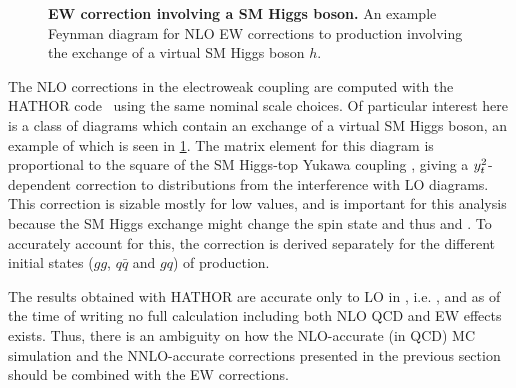 \begin{figure}[t]
    \centering
    \caption{\textbf{EW correction involving a SM Higgs boson.} An example Feynman diagram for NLO EW corrections to \ttbar production involving the exchange of a virtual SM Higgs boson $h$.}
    \label{fig:ah:ewcorr_feynman}
\end{figure}

The NLO corrections in the electroweak coupling \alphaew are computed with the HATHOR code~\cite{Aliev:2010zk, Kuhn:2005it, Kuhn:2006vh, Kuhn:2013zoa} using the same nominal scale choices. Of particular interest here is a class of diagrams which contain an exchange of a virtual SM Higgs boson, an example of which is seen in \cref{fig:ah:ewcorr_feynman}. The matrix element for this diagram is proportional to the square of the SM Higgs-top Yukawa coupling \yt, giving a $y_t^2$-dependent correction to \ttbar distributions from the interference with LO diagrams. This correction is sizable mostly for low \mtt values, and is important for this analysis because the SM Higgs exchange might change the \ttbar spin state and thus \chel and \chan. To accurately account for this, the correction is derived separately for the different initial states ($gg$, $q\bar{q}$ and $gq$) of \ttbar production.

The results obtained with HATHOR are accurate only to LO in \alphas, i.e. , and as of the time of writing no full calculation including both NLO QCD and EW effects exists. Thus, there is an ambiguity on how the NLO-accurate (in QCD) MC simulation and the NNLO-accurate corrections presented in the previous section should be combined with the EW corrections.


